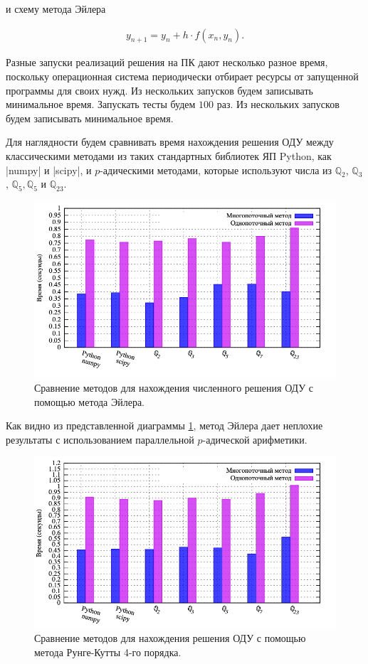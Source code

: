 \documentclass[master, och, times, pract]{sty/SCWorks}
\theoremstyle{plain}
\theoremstyle{definition}
\numberwithin{equation}{section}
\begin{document}
\noindent и схему метода Эйлера

\begin{equation}%
\begin{aligned}
y_{n+1}=y_n+h \cdot f(x_n, y_n).
\end{aligned}
\end{equation}


Разные запуски реализаций решения на ПК дают несколько разное время, поскольку операционная система периодически отбирает ресурсы от запущенной программы для своих нужд. Из нескольких запусков будем записывать минимальное время. Запускать тесты будем $100$ раз. Из нескольких запусков будем записывать минимальное время.

Для наглядности будем сравнивать время нахождения решения ОДУ между классическими методами из таких стандартных библиотек ЯП Python, как |numpy| и |scipy|, и $p$-адическими методами, которые используют числа из $\mathbb{Q}_2$, $\mathbb{Q}_3$, $\mathbb{Q}_5, \mathbb{Q}_5$ и $\mathbb{Q}_{23}$.

\begin{figure}[H]
\centerline{\includegraphics[width=0.85\linewidth]{../gnuplot/multi/euler/plot.png}}
\caption{Сравнение методов для нахождения численного решения ОДУ с помощью метода Эйлера.}
\label{img:multi:ode:euler}
\end{figure}


Как видно из представленной диаграммы \ref{img:multi:ode:euler}, метод Эйлера дает неплохие результаты с использованием параллельной $p$-адической арифметики.


\begin{figure}[H]
\centerline{\includegraphics[width=0.85\linewidth]{../gnuplot/multi/rk/plot.png}}
\caption{Сравнение методов для нахождения решения ОДУ с помощью метода Рунге-Кутты 4-го порядка.}
\label{img:comp:ode:rk}
\end{figure}
\end{document}
